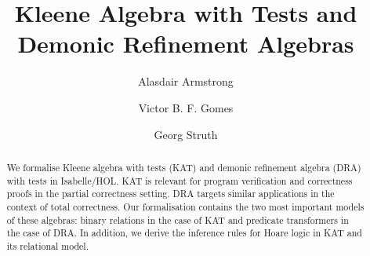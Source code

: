 \documentclass[11pt,a4paper]{article}
\begin{document}
\title{Kleene Algebra with Tests and Demonic Refinement Algebras}
\author{Alasdair Armstrong \and Victor B. F. Gomes \and Georg Struth}
\maketitle

\begin{abstract}
  We formalise Kleene algebra with tests (KAT) and demonic refinement
  algebra (DRA) with tests in Isabelle/HOL.  KAT is relevant for
  program verification and correctness proofs in the partial
  correctness setting.  DRA targets similar applications in the
  context of total correctness.  Our formalisation contains the two
  most important models of these algebras: binary relations in the
  case of KAT and predicate transformers in the case of DRA.  In
  addition, we derive the inference rules for Hoare logic in KAT and
  its relational model.
\end{abstract}

\tableofcontents





\end{document}
